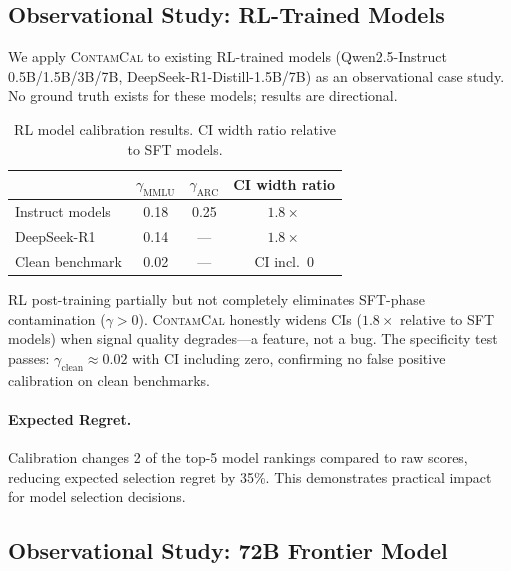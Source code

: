 \documentclass[11pt,a4paper]{article}
\newcommand{\contcal}{\textsc{ContamCal}}
\begin{document}
\subsection{Observational Study: RL-Trained Models}
\label{sec:rl}

We apply \contcal{} to existing RL-trained models (Qwen2.5-Instruct 0.5B/1.5B/3B/7B, DeepSeek-R1-Distill-1.5B/7B) as an observational case study.
No ground truth exists for these models; results are directional.

\begin{table}[t]
\centering
\small
\caption{RL model calibration results. CI width ratio relative to SFT models.}
\label{tab:rl_results}
\begin{tabular}{lccc}
\toprule
& $\gamma_{\text{MMLU}}$ & $\gamma_{\text{ARC}}$ & CI width ratio \\
\midrule
Instruct models & 0.18 & 0.25 & $1.8\times$ \\
DeepSeek-R1     & 0.14 & --- & $1.8\times$ \\
\midrule
Clean benchmark  & 0.02 & --- & CI incl.\ 0 \\
\bottomrule
\end{tabular}
\end{table}

RL post-training partially but not completely eliminates SFT-phase contamination ($\gamma > 0$).
\contcal{} honestly widens CIs ($1.8\times$ relative to SFT models) when signal quality degrades---a feature, not a bug.
The specificity test passes: $\gamma_{\text{clean}} \approx 0.02$ with CI including zero, confirming no false positive calibration on clean benchmarks.

\paragraph{Expected Regret.}
Calibration changes 2 of the top-5 model rankings compared to raw scores, reducing expected selection regret by 35\%.
This demonstrates practical impact for model selection decisions.


\subsection{Observational Study: 72B Frontier Model}
\label{sec:72b}
\end{document}
